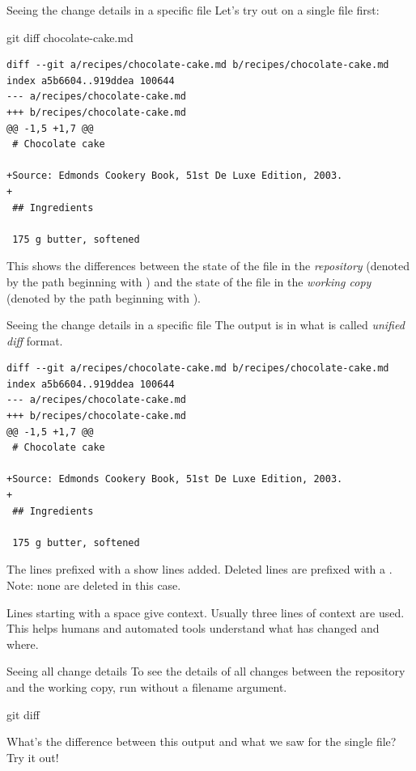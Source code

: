 \begin{frame}[fragile]{Seeing the change details in a specific file}
    Let's try  out on a single file first:
    \begin{shellcode}
        git diff chocolate-cake.md
    \end{shellcode}
    \begin{verbatim}
diff --git a/recipes/chocolate-cake.md b/recipes/chocolate-cake.md
index a5b6604..919ddea 100644
--- a/recipes/chocolate-cake.md
+++ b/recipes/chocolate-cake.md
@@ -1,5 +1,7 @@
 # Chocolate cake

+Source: Edmonds Cookery Book, 51st De Luxe Edition, 2003.
+
 ## Ingredients

 175 g butter, softened
    \end{verbatim}

    This shows the differences between the state of the file in the
    \emph{repository} (denoted by the path beginning with ) and the
    state of the file in the \emph{working copy} (denoted by the path
    beginning with ).
\end{frame}

\begin{frame}[fragile]{Seeing the change details in a specific file}
    The output is in what is called \emph{unified diff} format.
    \begin{verbatim}
diff --git a/recipes/chocolate-cake.md b/recipes/chocolate-cake.md
index a5b6604..919ddea 100644
--- a/recipes/chocolate-cake.md
+++ b/recipes/chocolate-cake.md
@@ -1,5 +1,7 @@
 # Chocolate cake

+Source: Edmonds Cookery Book, 51st De Luxe Edition, 2003.
+
 ## Ingredients

 175 g butter, softened
    \end{verbatim}
    The lines prefixed with a \code{+} show lines added.  Deleted lines are
    prefixed with a \code{-}.  Note: none are deleted in this case.

    Lines starting with a space give context.  Usually three lines of
    context are used.  This helps humans and automated tools understand what
    has changed and where.
\end{frame}

\begin{frame}[fragile]{Seeing all change details}
    To see the details of all changes between the repository and the working
    copy, run  without a filename argument.

    \begin{shellcode}
        git diff
    \end{shellcode}

    What's the difference between this output and what we saw for the single
    file?  Try it out!
\end{frame}

